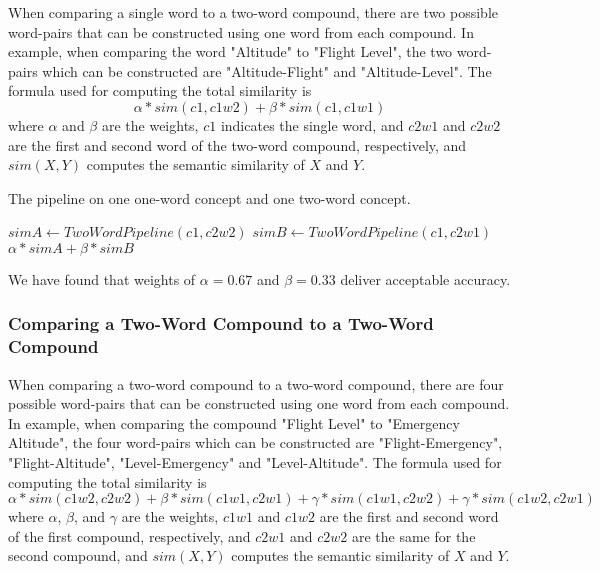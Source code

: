 \documentclass{article}
\begin{document}
When comparing a single word to a two-word compound, there are two possible word-pairs that can be constructed using one word from each compound. In example, when comparing the word "Altitude" to "Flight Level", the two word-pairs which can be constructed are "Altitude-Flight" and "Altitude-Level".
The formula used for computing the total similarity is 
\begin{equation} \label{eq:1wordto2word}
	\alpha * sim(c1, c1w2) + \beta * sim(c1, c1w1)
\end{equation}
where $\alpha$ and $\beta$ are the weights, $c1$ indicates the single word, and $c2w1$ and $c2w2$ are the first and second word of the two-word compound, respectively, and $sim(X,Y)$ computes the semantic similarity of $X$ and $Y$. %

\begin{algorithm}
\caption{The pipeline on one one-word concept and one two-word concept.}\label{al:onetwocompoundpipeline}
\begin{algorithmic}[1]
		\State $\textit{simA} \gets \textit{TwoWordPipeline}(c1, c2w2)$
		\State $\textit{simB} \gets \textit{TwoWordPipeline}(c1, c2w1)$
		\State \Return $\alpha * \textit{simA} + \beta * \textit{simB}$
	\EndProcedure
\end{algorithmic}
\end{algorithm}

We have found that weights of $\alpha = 0.67$ and $\beta = 0.33$ deliver acceptable accuracy. %

\subsubsection{Comparing a Two-Word Compound to a Two-Word Compound}

When comparing a two-word compound to a two-word compound, there are four possible word-pairs that can be constructed using one word from each compound. In example, when comparing the compound "Flight Level" to "Emergency Altitude", the four word-pairs which can be constructed are "Flight-Emergency", "Flight-Altitude", "Level-Emergency" and "Level-Altitude".
The formula used for computing the total similarity is 
\begin{equation} \label{eq:2wordto2word}
	\alpha * sim(c1w2, c2w2) + \beta * sim(c1w1, c2w1) + \gamma * sim(c1w1, c2w2) + \gamma * sim(c1w2, c2w1)
\end{equation}
where $\alpha$, $\beta$, and $\gamma$ are the weights, $c1w1$ and $c1w2$ are the first and second word of the first compound, respectively, and $c2w1$ and $c2w2$ are the same for the second compound, and $sim(X,Y)$ computes the semantic similarity of $X$ and $Y$. 
\end{document}
